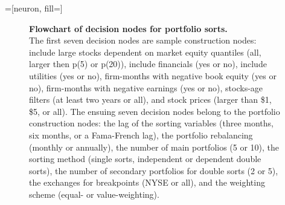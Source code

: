 
\makeatletter
 {\def\nnlayercolor{#1}}
\xpatchcmd{\linklayers}{\nn@lastnode}{\lastnode}{}{}
\xpatchcmd{\linklayers}{\nn@thisnode}{\thisnode}{}{}
\makeatother

=[neuron, fill=\nnlayercolor]
\newcommand{\hiddenlayercolor}[1][] { \layer[bias=true,nodeclass={hiddencl},#1] }
\newcommand{\outputlayercolor}[1][] { \layer[bias=true,nodeclass={output neuron},#1] }

\begin{landscape}
\begin{figure}[ht]
	\caption{\small {\bfseries Flowchart of decision nodes for portfolio sorts.} \\
    \footnotesize
     The first seven decision nodes are sample construction nodes: include large stocks dependent on market equity quantiles (all, larger then p(5) or p(20)), include financials (yes or no), include utilities (yes or no), firm-months with negative book equity (yes or no), firm-months with negative earnings (yes or no), stocks-age filters (at least two years or all), and stock prices (larger than \$1, \$5, or all). The ensuing seven decision nodes belong to the portfolio construction nodes: the lag of the sorting variables (three months, six months, or a Fama-French lag), the portfolio rebalancing (monthly or annually), the number of main portfolios (5 or 10), the sorting method (single sorts, independent or dependent double sorts), the number of secondary portfolios for double sorts (2 or 5), the exchanges for breakpoints (NYSE or all), and the weighting scheme (equal- or value-weighting).\\[-8px]}
    \label{fig_decision_nodes}
    \centering

    \begin{footnotesize}
		

\end{footnotesize}
\end{figure}
\end{landscape}
